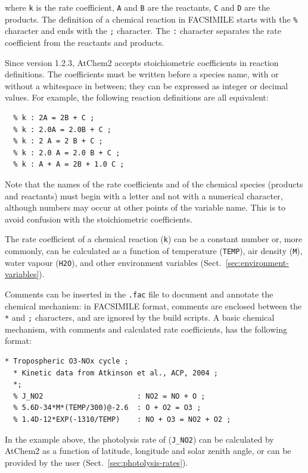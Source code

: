 where \texttt{k} is the rate coefficient, \texttt{A} and \texttt{B} are the reactants,
\texttt{C} and \texttt{D} are the products. The definition of a chemical reaction in FACSIMILE
starts with the \texttt{\%} character and ends with the \texttt{;} character. The \texttt{:}
character separates the rate coefficient from the reactants and products.

Since version 1.2.3, AtChem2 accepts stoichiometric coefficients in reaction definitions. The
coefficients must be written before a species name, with or without a whitespace in between;
they can be expressed as integer or decimal values. For example, the following reaction
definitions are all equivalent:

\begin{Verbatim}[fontsize=\small]
  % k : A + A = B + B + C ;
  % k : 2A = 2B + C ;
  % k : 2.0A = 2.0B + C ;
  % k : 2 A = 2 B + C ;
  % k : 2.0 A = 2.0 B + C ;
  % k : A + A = 2B + 1.0 C ;
\end{Verbatim}

Note that the names of the rate coefficients and of the chemical species (products and
reactants) must begin with a letter and not with a numerical character, although numbers may
occur at other points of the variable name. This is to avoid confusion with the stoichiometric
coefficients.

The rate coefficient of a chemical reaction (\texttt{k}) can be a constant number or, more
commonly, can be calculated as a function of temperature (\texttt{TEMP}), air density
(\texttt{M}), water vapour (\texttt{H2O}), and other environment variables
(Sect.~\ref{sec:environment-variables}).

Comments can be inserted in the \texttt{.fac} file to document and annotate the chemical
mechanism: in FACSIMILE format, comments are enclosed between the \texttt{*} and \texttt{;}
characters, and are ignored by the build scripts. A basic chemical mechanism, with comments and
calculated rate coefficients, has the following format:

\begin{Verbatim}[fontsize=\small]
  * Tropospheric O3-NOx cycle ;
  * Kinetic data from Atkinson et al., ACP, 2004 ;
  *;
  % J_NO2                      : NO2 = NO + O ;
  % 5.6D-34*M*(TEMP/300)@-2.6  : O + O2 = O3 ;
  % 1.4D-12*EXP(-1310/TEMP)    : NO + O3 = NO2 + O2 ;
\end{Verbatim}

In the example above, the photolysis rate of  (\texttt{J\_NO2}) can be calculated by
AtChem2 as a function of latitude, longitude and solar zenith angle, or can be provided by the
user (Sect.~\ref{sec:photolysis-rates}).

